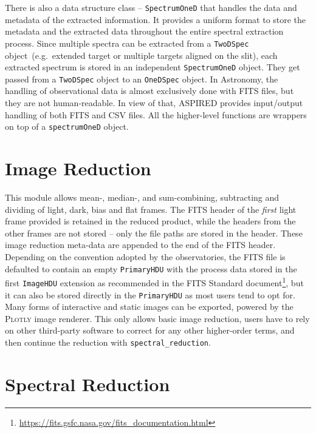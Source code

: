 \documentclass[linenumbers, twocolumn]{aastex631}
\begin{document}
There is also a data structure class -- \texttt{SpectrumOneD} that handles the
data and metadata of the extracted information. It provides a uniform format
to store the metadata and the extracted data throughout the entire spectral
extraction process. Since multiple spectra can be extracted from a
\texttt{TwoDSpec} object~(e.g.\ extended target or multiple targets aligned on
the slit), each extracted spectrum is stored in an independent
\texttt{SpectrumOneD} object. They get passed from a \texttt{TwoDSpec} object
to an \texttt{OneDSpec} object. In Astronomy, the handling of observational
data is almost exclusively done with FITS files, but they are not
human-readable. In view of that, \textsc{ASPIRED} provides input/output handling
of both FITS and CSV files. All the higher-level functions are wrappers on top
of a \texttt{spectrumOneD} object.

\section{Image Reduction}
\label{sec:image_reduction}
This module allows mean-, median-, and sum-combining, subtracting and dividing
of light, dark, bias and flat frames. The FITS header of the \textit{first}
light frame provided is retained in the reduced product, while the headers
from the other frames
are not stored -- only the file paths are stored in the header. These image
reduction meta-data are appended to the end of the FITS header. Depending on
the convention adopted by the observatories, the FITS file is defaulted to
contain an empty \texttt{PrimaryHDU} with the process data stored in the
first \texttt{ImageHDU} extension as recommended in the FITS Standard 
document\footnote{\url{https://fits.gsfc.nasa.gov/fits_documentation.html}},
but it can also be stored directly in the \texttt{PrimaryHDU} as most users tend
to opt for. Many forms of interactive and static images can be exported,
powered by the \textsc{Plotly} image renderer. This only allows basic image
reduction, users have to rely on other third-party software to correct for
any other higher-order terms, and then continue the reduction with
\texttt{spectral\_reduction}.

\section{Spectral Reduction}
\label{sec:spectral_reduction}
\end{document}
